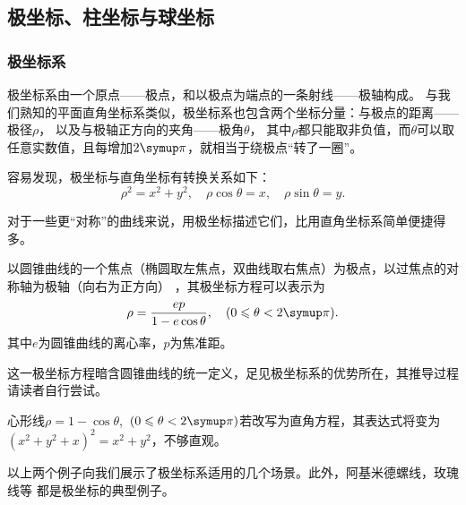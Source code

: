 \subsection{极坐标、柱坐标与球坐标}
\subsubsection{极坐标系}
极坐标系由一个原点——极点，和以极点为端点的一条射线——极轴构成。
与我们熟知的平面直角坐标系类似，极坐标系也包含两个坐标分量：与极点的距离——极径$\rho $，
以及与极轴正方向的夹角——极角$\theta $，
其中$\rho $都只能取非负值，而$\theta $可以取任意实数值，且每增加$2\symup\pi$，就相当于绕极点“转了一圈”。


容易发现，极坐标与直角坐标有转换关系如下：
\[
    \rho ^2=x^2+y^2,\quad\rho \cos \theta=x,\quad\rho \sin \theta=y
    .\]


对于一些更“对称”的曲线来说，用极坐标描述它们，比用直角坐标系简单便捷得多。
\begin{example}
    以圆锥曲线的一个焦点（椭圆取左焦点，双曲线取右焦点）为极点，以过焦点的对称轴为极轴（向右为正方向）
    ，其极坐标方程可以表示为
    \[
        \rho =\frac{ep}{1-e\cos \theta},\quad(0\leqslant \theta < 2 \symup\pi)
        .\]
    其中$e$为圆锥曲线的离心率，$p$为焦准距。
\end{example}


这一极坐标方程暗含圆锥曲线的统一定义，足见极坐标系的优势所在，其推导过程请读者自行尝试。%
\begin{example}
    心形线$\rho =1-\cos \theta$,~$ (0\leqslant \theta < 2 \symup\pi)$若改写为直角方程，其表达式将变为
    $(x^2+y^2+x)^2=x^2+y^2$，不够直观。
\end{example}

\begin{center}
\end{center}

以上两个例子向我们展示了极坐标系适用的几个场景。此外，阿基米德螺线，玫瑰线等
都是极坐标的典型例子。

